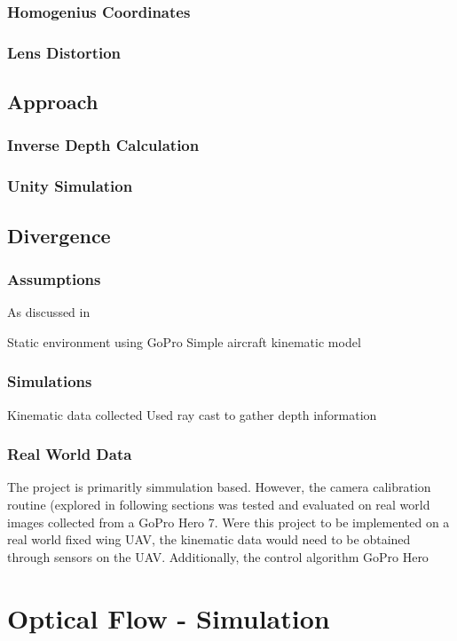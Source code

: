 \documentclass{UoNMCHA}
\numberwithin{equation}{section}
\begin{document}
\subsubsection{Homogenius Coordinates}

\subsubsection{Lens Distortion}
 
\subsection{Approach}
\subsubsection{Inverse Depth Calculation}
\subsubsection{Unity Simulation}
\subsection{Divergence}
\subsubsection{Assumptions}
As discussed in 

Static environment
using GoPro
Simple aircraft kinematic model
\subsubsection{Simulations}
Kinematic data collected
Used ray cast to gather depth information
\subsubsection{Real World Data}
The project is primaritly simmulation based. However, the camera calibration routine (explored in following sections was tested and evaluated on real world images collected from a GoPro Hero 7. Were this project to be implemented on a real world fixed wing UAV, the kinematic data would need to be obtained through sensors on the UAV. Additionally, the control algorithm
GoPro Hero
\newpage
\section{Optical Flow - Simulation}
\end{document}
